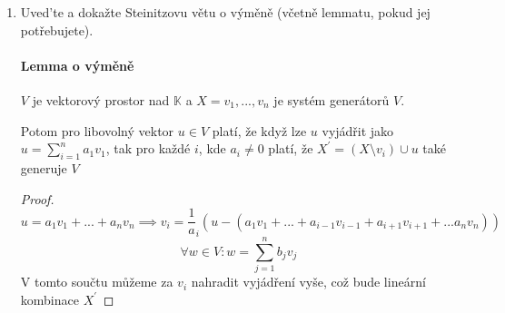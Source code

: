 \documentclass[10pt,a4paper]{article}
\begin{document}
\begin{enumerate}
\begin{proof}
Označme 

$W_1 = \displaystyle \bigcap_{X \subseteq U_i \subseteq V} U_i$ 

$W_2 = \{ \displaystyle \sum^n_{i=1} a_i \cdot v_i: a_i \in \mathbb{K}, v_i \in X, n \in \mathbb{N} \}$

Dokažme $W_1 = W_2$:

\begin{enumerate}

\item $W_2 \subseteq W_1$
\begin{equation*}
u \in W_2 \implies u = \sum_{v_i \in X} a_i v_i \underset{\forall U \text{ je uzavřený na } +, \cdot }{\implies} \forall U: u \in U \implies u \in W_1
\end{equation*}

\item $W_1 \subseteq W_2$

 
$W_2$ je podprostor uzavřený na sčítání a násobení (lze ukázat jednoduše), nutně obsahuje množinu $X$ (stačí zvolit vždy $a_i = 1, a_{j\neq i} = 0$), čili jeden z možných podprostorů U tvořících průnik ($\exists i: U_i = W_2$), tedy definičně $W_1 \subseteq U_i \implies W_1 \subseteq W_2$

\end{enumerate}


\end{proof}

\item Uved’te a dokažte Steinitzovu větu o výměně (včetně lemmatu, pokud jej potřebujete). 

\paragraph{Lemma o výměně} $V$ je vektorový prostor nad $\mathbb{K}$ a $X = {v_1, ..., v_n}$ je systém generátorů $V$.

Potom pro libovolný vektor $u \in V$ platí, že když lze $u$ vyjádřit jako $u = \displaystyle \sum^n_{i=1} a_1v_1$, tak pro každé $i$, kde $a_i \neq 0$ platí, že $X^\prime = (X \setminus v_i) \cup u$ také generuje $V$

\begin{proof}
\begin{equation*}
u = a_1v_1 + ... + a_nv_n \implies v_i = \frac1a_i (u - (a_1v_1 + ... + a_{i-1}v_{i-1}+  a_{i+1}v_{i+1} + ...  a_{n}v_{n}))
\end{equation*}
\begin{equation*}
\forall w \in V: w = \sum_{j=1}^n b_j v_j
\end{equation*}
V tomto součtu můžeme za $v_i$ nahradit vyjádření vyše, což bude lineární kombinace $X^\prime$
\end{proof}


\end{enumerate}
\end{document}

